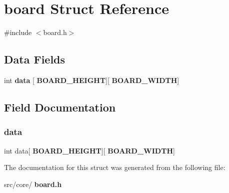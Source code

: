 \section{board Struct Reference}
\label{structboard}


{\ttfamily \#include $<$board.\+h$>$}

\subsection*{Data Fields}
\begin{DoxyCompactItemize}
\item 
int \textbf{ data} [\textbf{ B\+O\+A\+R\+D\+\_\+\+H\+E\+I\+G\+HT}][\textbf{ B\+O\+A\+R\+D\+\_\+\+W\+I\+D\+TH}]
\end{DoxyCompactItemize}


\subsection{Field Documentation}
\mbox{\label{structboard_acee8899c98fdca2802c720bd239cb592}} 
\subsubsection{data}
{\footnotesize\ttfamily int data[\textbf{ B\+O\+A\+R\+D\+\_\+\+H\+E\+I\+G\+HT}][\textbf{ B\+O\+A\+R\+D\+\_\+\+W\+I\+D\+TH}]}



The documentation for this struct was generated from the following file\+:\begin{DoxyCompactItemize}
\item 
src/core/\textbf{ board.\+h}\end{DoxyCompactItemize}
